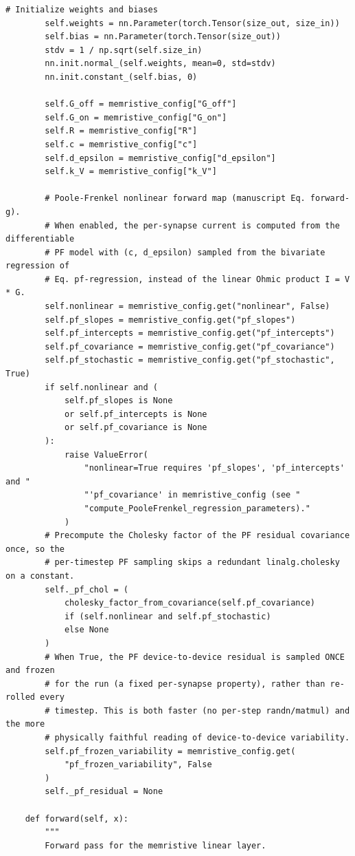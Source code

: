 \begin{lstlisting}[caption={mnn\_torch/layers.py},label={lst:mnn-src-layers}]
        # Initialize weights and biases
        self.weights = nn.Parameter(torch.Tensor(size_out, size_in))
        self.bias = nn.Parameter(torch.Tensor(size_out))
        stdv = 1 / np.sqrt(self.size_in)
        nn.init.normal_(self.weights, mean=0, std=stdv)
        nn.init.constant_(self.bias, 0)

        self.G_off = memristive_config["G_off"]
        self.G_on = memristive_config["G_on"]
        self.R = memristive_config["R"]
        self.c = memristive_config["c"]
        self.d_epsilon = memristive_config["d_epsilon"]
        self.k_V = memristive_config["k_V"]

        # Poole-Frenkel nonlinear forward map (manuscript Eq. forward-g).
        # When enabled, the per-synapse current is computed from the differentiable
        # PF model with (c, d_epsilon) sampled from the bivariate regression of
        # Eq. pf-regression, instead of the linear Ohmic product I = V * G.
        self.nonlinear = memristive_config.get("nonlinear", False)
        self.pf_slopes = memristive_config.get("pf_slopes")
        self.pf_intercepts = memristive_config.get("pf_intercepts")
        self.pf_covariance = memristive_config.get("pf_covariance")
        self.pf_stochastic = memristive_config.get("pf_stochastic", True)
        if self.nonlinear and (
            self.pf_slopes is None
            or self.pf_intercepts is None
            or self.pf_covariance is None
        ):
            raise ValueError(
                "nonlinear=True requires 'pf_slopes', 'pf_intercepts' and "
                "'pf_covariance' in memristive_config (see "
                "compute_PooleFrenkel_regression_parameters)."
            )
        # Precompute the Cholesky factor of the PF residual covariance once, so the
        # per-timestep PF sampling skips a redundant linalg.cholesky on a constant.
        self._pf_chol = (
            cholesky_factor_from_covariance(self.pf_covariance)
            if (self.nonlinear and self.pf_stochastic)
            else None
        )
        # When True, the PF device-to-device residual is sampled ONCE and frozen
        # for the run (a fixed per-synapse property), rather than re-rolled every
        # timestep. This is both faster (no per-step randn/matmul) and the more
        # physically faithful reading of device-to-device variability.
        self.pf_frozen_variability = memristive_config.get(
            "pf_frozen_variability", False
        )
        self._pf_residual = None

    def forward(self, x):
        """
        Forward pass for the memristive linear layer.


\end{lstlisting}
